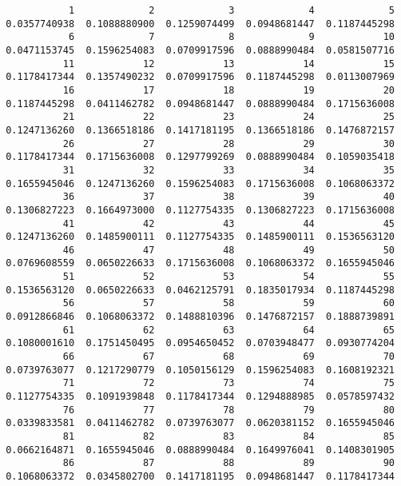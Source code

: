 \documentclass[
  letterpaper,
  DIV=11,
  numbers=noendperiod]{scrreprt}
\begin{document}
\begin{verbatim}
            1             2             3             4             5 
 0.0357740938  0.1088880900  0.1259074499  0.0948681447  0.1187445298 
            6             7             8             9            10 
 0.0471153745  0.1596254083  0.0709917596  0.0888990484  0.0581507716 
           11            12            13            14            15 
 0.1178417344  0.1357490232  0.0709917596  0.1187445298  0.0113007969 
           16            17            18            19            20 
 0.1187445298  0.0411462782  0.0948681447  0.0888990484  0.1715636008 
           21            22            23            24            25 
 0.1247136260  0.1366518186  0.1417181195  0.1366518186  0.1476872157 
           26            27            28            29            30 
 0.1178417344  0.1715636008  0.1297799269  0.0888990484  0.1059035418 
           31            32            33            34            35 
 0.1655945046  0.1247136260  0.1596254083  0.1715636008  0.1068063372 
           36            37            38            39            40 
 0.1306827223  0.1664973000  0.1127754335  0.1306827223  0.1715636008 
           41            42            43            44            45 
 0.1247136260  0.1485900111  0.1127754335  0.1485900111  0.1536563120 
           46            47            48            49            50 
 0.0769608559  0.0650226633  0.1715636008  0.1068063372  0.1655945046 
           51            52            53            54            55 
 0.1536563120  0.0650226633  0.0462125791  0.1835017934  0.1187445298 
           56            57            58            59            60 
 0.0912866846  0.1068063372  0.1488810396  0.1476872157  0.1888739891 
           61            62            63            64            65 
 0.1080001610  0.1751450495  0.0954650452  0.0703948477  0.0930774204 
           66            67            68            69            70 
 0.0739763077  0.1217290779  0.1050156129  0.1596254083  0.1608192321 
           71            72            73            74            75 
 0.1127754335  0.1091939848  0.1178417344  0.1294888985  0.0578597432 
           76            77            78            79            80 
 0.0339833581  0.0411462782  0.0739763077  0.0620381152  0.1655945046 
           81            82            83            84            85 
 0.0662164871  0.1655945046  0.0888990484  0.1649976041  0.1408301905 
           86            87            88            89            90 
 0.1068063372  0.0345802700  0.1417181195  0.0948681447  0.1178417344 

\end{verbatim}
\end{document}
